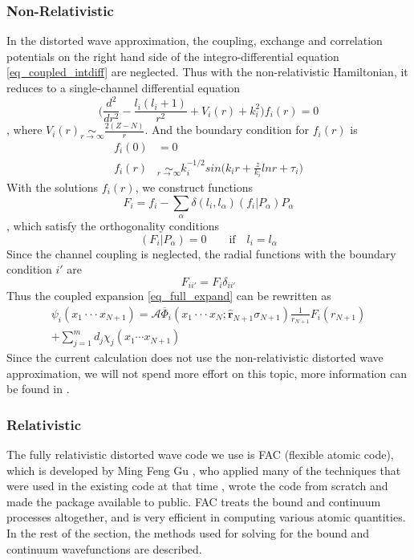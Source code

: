 \subsubsection{Non-Relativistic}
In the distorted wave approximation, the coupling, exchange and correlation potentials on the right hand side of the integro-differential equation \ref{eq_coupled_intdiff} are neglected. Thus with the non-relativistic Hamiltonian, it reduces to a single-channel differential equation \citep{book_int_diff}
\begin{equation}
\Bigg(\frac{d^2}{dr^2} - \frac{l_i(l_i+1)}{r^2} +V_i(r) + k_{i}^2\Bigg) f_{i}(r) = 0
\end{equation}                    
, where $V_i(r)\underset{r \to \infty}{\sim} \frac{2(Z-N)}{r}$. And the boundary condition for $f_i(r)$ is
\begin{subequations}
	\begin{align}
		f_i(0) &= 0 \\
		f_i(r) &\underset{r \to \infty}{\sim} k_i^{-1/2}sin\Bigg( k_ir+\frac{z}{k_i}lnr+\tau_i \Bigg)
	\end{align}
\end{subequations}
With the solutions $f_i(r)$, we construct functions
\begin{equation}
	F_i = f_i - \sum_{\alpha}\delta(l_i, l_\alpha)(f_i|P_\alpha)P_\alpha
\end{equation}
, which satisfy the orthogonality conditions
\begin{equation}
	(F_i|P_\alpha) = 0 \qquad  \text{if} \quad l_i= l_\alpha
\end{equation}
Since the channel coupling is neglected, the radial functions with the boundary condition $i'$ are 
\begin{equation}
	F_{ii'} = F_i \delta_{ii'}
\end{equation}
Thus the coupled expansion \ref{eq_full_expand} can be rewritten as
\begin{multline} \label{eq_full_expand_dw}
	\psi_i(x_1\cdot\cdot\cdot x_{N+1}) = \mathcal{A}\overline{\Phi}_i(x_1\cdot\cdot\cdot x_{N}; \hat{\textbf{r}}_{N+1}\sigma_{N+1}) \frac{1}{r_{N+1}} F_{i}(r_{N+1}) \\+ \sum_{j=1}^m d_{j} \chi_j(x_1\cdots x_{N+1}) 
\end{multline}
Since the current calculation does not use the non-relativistic distorted wave approximation, we will not spend more effort on this topic, more information can be found in \citet{ucl_dw}.


\subsubsection{Relativistic}
The fully relativistic distorted wave code we use is FAC (flexible atomic code), which is developed by Ming Feng Gu \citep{gu_2008}, who applied many of the techniques that were used in the existing code at that time \citep{dw_guoxin, dw_sampson, dw_zhang, hullac}, wrote the code from scratch and made the package available to public. FAC treats the bound and continuum processes altogether, and is very efficient in computing various atomic quantities. In the rest of the section, the methods used for solving for the bound and continuum wavefunctions are described.

